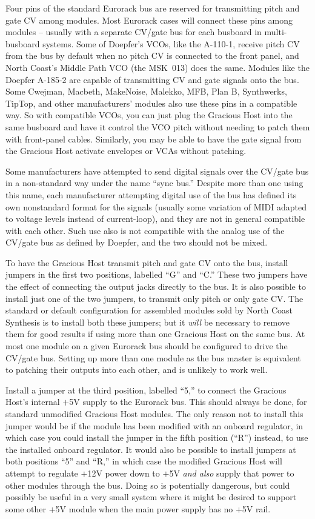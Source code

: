 Four pins of the standard Eurorack bus are reserved for transmitting pitch
and gate CV among modules.  Most Eurorack cases will connect these pins
among modules -- usually with a separate CV/gate bus for each busboard in
multi-busboard systems.  Some of Doepfer's VCOs, like the A-110-1, receive
pitch CV from the bus by default when no pitch CV is connected to the front
panel, and North Coast's Middle Path VCO (the MSK~013) does the same. 
Modules like the Doepfer A-185-2 are capable of transmitting CV and gate
signals onto the bus.  Some Cwejman, Macbeth, MakeNoise, Malekko, MFB, Plan
B, Synthwerks, TipTop, and other manufacturers' modules also use these pins
in a compatible way.  So with compatible VCOs, you can just plug the
Gracious Host into the same busboard and have it control the VCO pitch
without needing to patch them with front-panel cables.  Similarly, you may
be able to have the gate signal from the Gracious Host activate envelopes or
VCAs without patching.

Some manufacturers have attempted to send digital signals over the CV/gate
bus in a non-standard way under the name ``sync bus.'' Despite more than one
using this name, each manufacturer attempting digital use of the bus has
defined its own nonstandard format for the signals (usually some variation
of MIDI adapted to voltage levels instead of current-loop), and they are not
in general compatible with each other.  Such use also is not compatible with
the analog use of the CV/gate bus as defined by Doepfer, and the two should
not be mixed.

To have the Gracious Host transmit pitch and gate CV onto the bus, install
jumpers in the first two positions, labelled ``G'' and ``C.'' These two
jumpers have the effect of connecting the output jacks directly to the bus. 
It is also possible to install just one of the two jumpers, to transmit only
pitch or only gate CV.  The standard or default configuration for assembled
modules sold by North Coast Synthesis is to install both these jumpers; but
it \emph{will} be necessary to remove them for good results if using more
than one Gracious Host on the same bus.  At most one module on a given
Eurorack bus should be configured to drive the CV/gate bus.  Setting up more
than one module as the bus master is equivalent to patching their outputs
into each other, and is unlikely to work well.

Install a jumper at the third position, labelled ``5,'' to connect the
Gracious Host's internal $+$5V supply to the Eurorack bus.  This should
always be done, for standard unmodified Gracious Host modules.  The only
reason not to install this jumper would be if the module has been modified
with an onboard regulator, in which case you could install the jumper in the
fifth position (``R'') instead, to use the installed onboard regulator.  It
would also be possible to install jumpers at both positions ``5'' and ``R,''
in which case the modified Gracious Host will attempt to regulate $+$12V
power down to $+$5V \emph{and also} supply that power to other modules
through the bus.  Doing so is potentially dangerous, but could possibly be
useful in a very small system where it might be desired to support some
other $+$5V module when the main power supply has no $+$5V rail.

